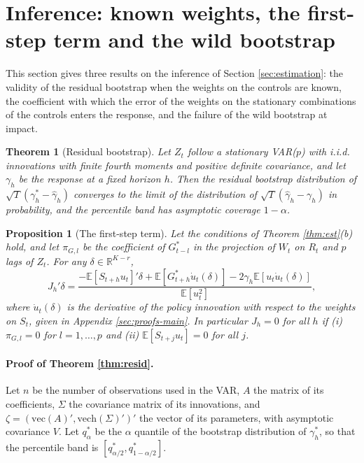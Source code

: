 \documentclass[12pt,a4paper]{article}
\newtheorem{thm}{Theorem}
\newtheorem{prop}{Proposition}
\theoremstyle{definition}
\newcommand{\E}{\mathbb{E}}
\begin{document}
\section{Inference: known weights, the first-step term and the wild bootstrap\label{sec:supp-inf}}

This section gives three results on the inference of Section \ref{sec:estimation}: the validity of the residual bootstrap when the weights on the controls are known, the coefficient with which the error of the weights on the stationary combinations of the controls enters the response, and the failure of the wild bootstrap at impact.

\begin{thm}[Residual bootstrap\label{thm:resid}]
Let $Z_t$ follow a stationary VAR($p$) with i.i.d. innovations with finite fourth moments and positive definite covariance, and let $\gamma_h$ be the response at a fixed horizon $h$. Then the residual bootstrap distribution of $\sqrt{T}(\gamma_h^\ast-\hat\gamma_h)$ converges to the limit of the distribution of $\sqrt{T}(\hat\gamma_h-\gamma_h)$ in probability, and the percentile band has asymptotic coverage $1-\alpha$.
\end{thm}

\begin{prop}[The first-step term\label{prop:J}]
Let the conditions of Theorem \ref{thm:est}(b) hold, and let $\pi_{G,l}$ be the coefficient of $G^\ast_{t-l}$ in the projection of $W_t$ on $R_t$ and $p$ lags of $Z_t$. For any $\delta\in\mathbb{R}^{K-r}$,
\begin{equation}
J_h'\delta=\frac{-\E[S_{t+h}u_t]'\delta+\E[G^\ast_{t+h}\dot u_t(\delta)]-2\gamma_h\E[u_t\dot u_t(\delta)]}{\E[u_t^2]},
\label{eq:J}
\end{equation}
where $\dot u_t(\delta)$ is the derivative of the policy innovation with respect to the weights on $S_t$, given in Appendix \ref{sec:proofs-main}. In particular $J_h=0$ for all $h$ if (i) $\pi_{G,l}=0$ for $l=1,\dots,p$ and (ii) $\E[S_{t+j}u_t]=0$ for all $j$.
\end{prop}

\paragraph{Proof of Theorem \ref{thm:resid}.} Let $n$ be the number of observations used in the VAR, $A$ the matrix of its coefficients, $\Sigma$ the covariance matrix of its innovations, and $\zeta=(\mathrm{vec}(A)',\mathrm{vech}(\Sigma)')'$ the vector of its parameters, with asymptotic covariance $V$. Let $q^\ast_\alpha$ be the $\alpha$ quantile of the bootstrap distribution of $\gamma^\ast_h$, so that the percentile band is $[q^\ast_{\alpha/2},q^\ast_{1-\alpha/2}]$.
\end{document}
